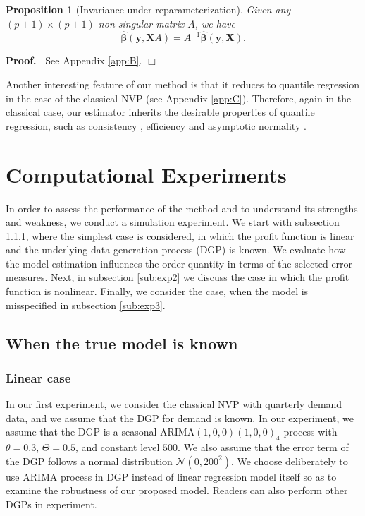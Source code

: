 \documentclass{article}
\newtheorem{proposition}{Proposition}
\newenvironment{proof}
 {\begin{trivlist} \item[] {\bf Proof.\ }}{\hfill$\Box$ \end{trivlist}}
\begin{document}
\begin{proposition}[Invariance under reparameterization]
Given any $(p+1)\times (p+1)$ non-singular matrix $A$, we have
\[
        \hat{\boldsymbol{\beta}}(\mathbf{y},\mathbf{X}A)=A^{-1}\hat{\boldsymbol{\beta}}(\mathbf{y},\mathbf{X}).
\]
\end{proposition}
\begin{proof}
See Appendix \ref{app:B}.
\end{proof}

Another interesting feature of our method is that it reduces to quantile regression in the case of the classical NVP (see Appendix \ref{app:C}). Therefore, again in the classical case, our estimator
inherits the desirable properties of quantile regression, such as
consistency \cite{Koe05}, efficiency \cite{KM99} and asymptotic
normality \cite{KHM05}.

\section{Computational Experiments} \label{se:results}

In order to assess the performance of the method and to understand its strengths and weakness, we conduct a simulation experiment. We start with subsection \ref{sub:exp1}, where the simplest case is considered, in which the profit function is linear and the underlying data generation process (DGP) is known. We evaluate how the model estimation influences the order quantity in terms of the selected error measures. Next, in subsection \ref{sub:exp2} we discuss the case in which the profit function is nonlinear. Finally, we consider the case, when the model is misspecified in subsection \ref{sub:exp3}.

\subsection{When the true model is known}
\subsubsection{Linear case} \label{sub:exp1}

In our first experiment, we consider the classical NVP with quarterly demand data, and we assume that the DGP for demand is known. In our experiment, we assume that the DGP is a seasonal ARIMA$(1,0,0)(1,0,0)_4$ process with $\theta=0.3$, $\Theta=0.5$, and constant level $500$. We also assume that the error term of the DGP follows a normal distribution $\mathcal{N}(0,200^2)$. We choose deliberately to use ARIMA process in DGP instead of linear regression model itself so as to examine the robustness of our proposed model. Readers can also perform other DGPs in experiment.
\end{document}
